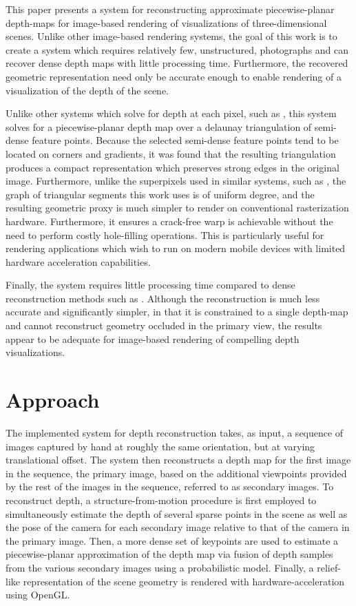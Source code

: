\documentclass[conference]{acmsiggraph}
\begin{document}
This paper presents a system for reconstructing approximate
piecewise-planar depth-maps for image-based rendering of visualizations
of three-dimensional scenes.  Unlike other image-based rendering systems,
the goal of this work is to create a system which requires relatively few,
unstructured, photographs and can recover dense depth maps with little
processing time.  Furthermore, the recovered geometric representation need
only be accurate enough to enable rendering of a visualization of the depth
of the scene.

Unlike other systems which solve for depth at each pixel,
such as \cite{stuhmer2010real}, this system solves
for a piecewise-planar depth map over a delaunay triangulation
of semi-dense feature points.  Because the selected
semi-dense feature points tend to be located on corners
and gradients, it was found that the resulting triangulation
produces a compact representation which preserves strong
edges in the original image.  Furthermore, unlike the superpixels
used in similar systems, such as \cite{chaurasia2013depth},
the graph of triangular segments this work uses is of uniform degree,
and the resulting geometric proxy is much simpler to render on conventional
rasterization hardware. Furthermore, it ensures a crack-free warp is
achievable without the need to perform costly hole-filling operations.
This is particularly useful for rendering applications which wish to
run on modern mobile devices with limited hardware acceleration capabilities.

Finally, the system requires little processing time compared
to dense reconstruction methods such as \cite{furukawa2010accurate}.
Although the reconstruction is much less accurate and significantly simpler,
in that it is constrained to a single depth-map and cannot reconstruct
geometry occluded in the primary view,
the results appear to be adequate for image-based rendering of compelling depth
visualizations.

\section{Approach}

The implemented system for depth reconstruction takes, as input, a sequence
of images captured by hand at roughly the same orientation, but at varying
translational offset.  The system then reconstructs a depth map for the
first image in the sequence, the primary image, based on the additional
viewpoints provided by the rest of the images in the sequence,
referred to as secondary images.
To reconstruct depth, a structure-from-motion
procedure is first employed to simultaneously estimate the depth of several
sparse points in the scene as well as the pose of the camera
for each secondary image relative to that of the camera in the primary image.
Then, a more dense set of keypoints are used to 
estimate a piecewise-planar approximation of the depth map
via fusion of depth samples from the various secondary images using
a probabilistic model.
Finally, a relief-like representation of the scene geometry is rendered
with hardware-acceleration using OpenGL.
\end{document}
